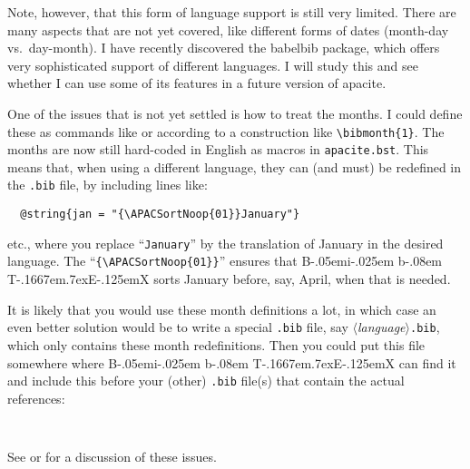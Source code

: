 \documentclass{article}
\def\BibTeX{{\rm B\kern-.05em{\sc i\kern-.025em b}\kern-.08em
    T\kern-.1667em\lower.7ex\hbox{E}\kern-.125emX}}%
\newcommand{\pkg}[1]{\textsf{#1}}%
\newcommand{\fname}[1]{\texttt{#1}}%
\newcommand{\cmd}[1]{\texttt{\string#1}}%
\newcommand{\opt}[1]{$\langle${\itshape #1}$\rangle$}%
\begin{document}
Note, however, that this form of language support is still very limited.
There are many aspects that are not yet covered, like different forms of
dates (month-day vs.\ day-month). I have recently discovered the
\pkg{babelbib} package, which offers very sophisticated support of
different languages. I will study this and see whether I can use some
of its features in a future version of \pkg{apacite}.

One of the issues that is not yet settled is how to treat the months.
I could define these as commands like \cmd{\January} or according
to a construction like \verb+\bibmonth{1}+. The months are now still
hard-coded in English as macros in \fname{apacite.bst}.
This means that, when using a different language, they can (and must)
be redefined in the \fname{.bib} file, by including lines like:
\begin{verbatim}
  @string{jan = "{\APACSortNoop{01}}January"}
\end{verbatim}
etc., where you replace ``\verb+January+'' by the translation of January
in the desired language. The ``\verb+{\APACSortNoop{01}}+'' ensures that
\BibTeX{} sorts January before, say, April, when that is needed.

It is likely that you would use these month definitions a lot, in which case
an even better solution would be to write a special \fname{.bib} file, say
\opt{language}\fname{.bib}, which only contains these month redefinitions.
Then you could put this file somewhere where \BibTeX{} can find it and include
this before your (other) \fname{.bib} file(s) that contain the actual
references:
\begin{verbatim}


\end{verbatim}
See  or  for a discussion
of these issues.

\end{document}

